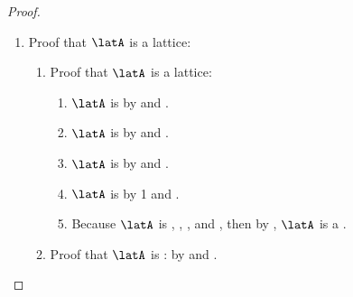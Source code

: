 \begin{proof}
\begin{enumerate}
\begin{enumerate}
      \item Proof that $(xy)z=x(yz)$:
        \begin{align*}
          (xy)z
            &= \brs{(Q+x)(Q+y)}(Q+z)
            && \text{by \pref{item:s1951_meetas_Qx}}
          \\&= (Q+xy)(Q+z)
            && \text{by \prope{disjunctive distributive} property \xref{item:s1951_joind}}
          \\&= Q+(xy)z
            && \text{by \prope{disjunctive distributive} property \xref{item:s1951_joind}}
          \\&= Q+P
            && \text{by definition of $P$ \xref{item:s1951_meetas_PQ}}
          \\&= P+Q
            && \text{by \prope{join commutative} property \xref{item:s1951_joinc}}
          \\&= P+x(yz)
            && \text{by definition of $Q$ \xref{item:s1951_meetas_PQ}}
          \\&= (P+x)(P+yz)
            && \text{by \prope{disjunctive distributive} property \xref{item:s1951_joind}}
          \\&= (P+x)\brs{(P+y)(P+z)}
            && \text{by \prope{disjunctive distributive} property \xref{item:s1951_joind}}
          \\&= x(yz)
            && \text{by \pref{item:s1951_meetas_Px}}
        \end{align*}
    \end{enumerate}


  \item Proof that $\latA$ is a  lattice:
    \begin{enumerate}
      \item Proof that $\latA$ is a lattice:
        \begin{enumerate}
          \item $\latA$ is   by  and .
          \item $\latA$ is  by  and .
          \item $\latA$ is  by  and .
          \item $\latA$ is   by 1 and .
          \item Because $\latA$ is
                , , , and ,
                then by , $\latA$ is a .
        \end{enumerate}

      \item Proof that $\latA$ is :
            by  and .
    \end{enumerate}
\end{enumerate}
\end{proof}




